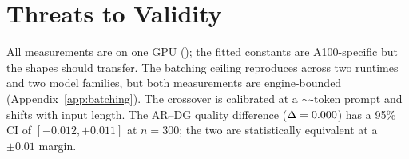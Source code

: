 \section{Threats to Validity}
\label{sec:threats}

All measurements are on one GPU (\gpuModel{}); the fitted constants are
A100-specific but the shapes should transfer. The batching ceiling reproduces
across two runtimes and two model families, but both measurements are
engine-bounded (Appendix~\ref{app:batching}). The crossover is calibrated at
a $\sim$-token prompt and shifts with input length. The AR--DG
quality difference ($\Delta = 0.000$) has a 95\% CI of $[-0.012,
+0.011]$ at $n=300$; the two are statistically equivalent at a $\pm 0.01$
margin.

